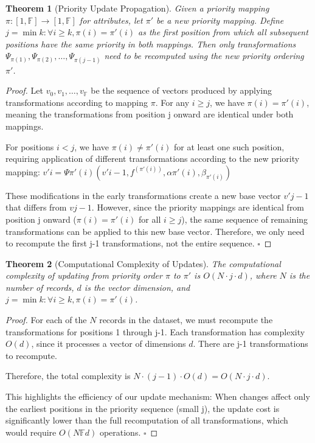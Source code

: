 \documentclass[numbers,sort]{article}
\newtheorem{theorem}{Theorem}
\begin{document}
\begin{theorem}[Priority Update Propagation]
Given a priority mapping $\pi: [1, \mathbb{F}] \rightarrow [1, \mathbb{F}]$ for attributes, let $\pi'$ be a new priority mapping. Define $j = \min{k:\forall i\ge k, \pi(i)=\pi'(i)}$ as the first position from which all subsequent positions have the same priority in both mappings. Then only transformations $\Psi_{\pi(1)}, \Psi_{\pi(2)}, \ldots, \Psi_{\pi(j-1)}$ need to be recomputed using the new priority ordering $\pi'$.
\end{theorem}
\begin{proof}
Let $v_0, v_1, \ldots, v_{\mathbb{F}}$ be the sequence of vectors produced by applying transformations according to mapping $\pi$. For any $i \geq j$, we have $\pi(i) = \pi'(i)$, meaning the transformations from position j onward are identical under both mappings.

For positions $i < j$, we have $\pi(i) \neq \pi'(i)$ for at least one such position, requiring application of different transformations according to the new priority mapping:
$v'i = \Psi{\pi'(i)}(v'{i-1}, f^{(\pi'(i))}, \alpha{\pi'(i)}, \beta_{\pi'(i)})$

These modifications in the early transformations create a new base vector $v'{j-1}$ that differs from $v{j-1}$. However, since the priority mappings are identical from position j onward ($\pi(i) = \pi'(i)$ for all $i \geq j$), the same sequence of remaining transformations can be applied to this new base vector. Therefore, we only need to recompute the first j-1 transformations, not the entire sequence. $\square$
\end{proof}

\begin{theorem}[Computational Complexity of Updates]
The computational complexity of updating from priority order $\pi$ to $\pi'$ is $O(N \cdot j \cdot d)$, where $N$ is the number of records, $d$ is the vector dimension, and $j = \min{k:\forall i\ge k, \pi(i)=\pi'(i)}$.
\end{theorem}

\begin{proof}
For each of the $N$ records in the dataset, we must recompute the transformations for positions 1 through j-1. Each transformation has complexity $O(d)$, since it processes a vector of dimensions $d$. There are j-1 transformations to recompute.

Therefore, the total complexity is $N \cdot (j-1) \cdot O(d) = O(N \cdot j \cdot d)$.

This highlights the efficiency of our update mechanism: When changes affect only the earliest positions in the priority sequence (small j), the update cost is significantly lower than the full recomputation of all transformations, which would require $O(N\mathbb{F}d)$ operations. $\square$
\end{proof}
\end{document}
